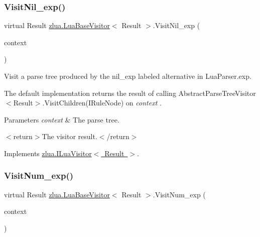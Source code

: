 \mbox{\label{classzlua_1_1_lua_base_visitor_a8cf392e61aeb04b51f5dab36367615f9}} 
\subsubsection{\texorpdfstring{Visit\+Nil\+\_\+exp()}{VisitNil\_exp()}}
{\footnotesize\ttfamily virtual Result \mbox{\hyperlink{classzlua_1_1_lua_base_visitor}{zlua.\+Lua\+Base\+Visitor}}$<$ Result $>$.Visit\+Nil\+\_\+exp (\begin{DoxyParamCaption}\item[{\mbox{[}\+Not\+Null\mbox{]} \mbox{\hyperlink{classzlua_1_1_lua_parser_1_1_nil__exp_context}{Lua\+Parser.\+Nil\+\_\+exp\+Context}}}]{context }\end{DoxyParamCaption})\hspace{0.3cm}{\ttfamily [virtual]}}



Visit a parse tree produced by the {\ttfamily nil\+\_\+exp} labeled alternative in Lua\+Parser.\+exp. 

The default implementation returns the result of calling Abstract\+Parse\+Tree\+Visitor$<$\+Result$>$.\+Visit\+Children(\+I\+Rule\+Node) on {\itshape context} . 


\begin{DoxyParams}{Parameters}
{\em context} & The parse tree.\\
\hline
\end{DoxyParams}
$<$return$>$The visitor result.$<$/return$>$ 

Implements \mbox{\hyperlink{interfacezlua_1_1_i_lua_visitor_ae639ec945d2612029298b119ce63c23e}{zlua.\+I\+Lua\+Visitor$<$ Result $>$}}.

\mbox{\label{classzlua_1_1_lua_base_visitor_a8d8efa823f6a737821a8b4d10bfe2cd9}} 
\subsubsection{\texorpdfstring{Visit\+Num\+\_\+exp()}{VisitNum\_exp()}}
{\footnotesize\ttfamily virtual Result \mbox{\hyperlink{classzlua_1_1_lua_base_visitor}{zlua.\+Lua\+Base\+Visitor}}$<$ Result $>$.Visit\+Num\+\_\+exp (\begin{DoxyParamCaption}\item[{\mbox{[}\+Not\+Null\mbox{]} \mbox{\hyperlink{classzlua_1_1_lua_parser_1_1_num__exp_context}{Lua\+Parser.\+Num\+\_\+exp\+Context}}}]{context }\end{DoxyParamCaption})\hspace{0.3cm}{\ttfamily [virtual]}}



